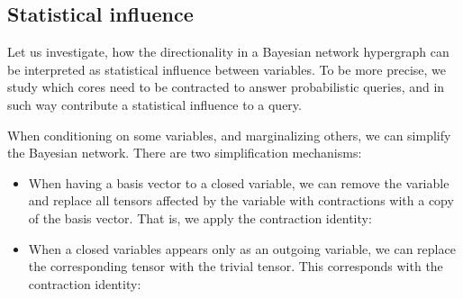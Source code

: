\subsection{Statistical influence}

Let us investigate, how the directionality in a Bayesian network hypergraph can be interpreted as statistical influence between variables.
To be more precise, we study which cores need to be contracted to answer probabilistic queries, and in such way contribute a statistical influence to a query.

When conditioning on some variables, and marginalizing others, we can simplify the Bayesian network.
There are two simplification mechanisms:
\begin{itemize}
    \item[(i)] When having a basis vector to a closed variable, we can remove the variable and replace all tensors affected by the variable with contractions with a copy of the basis vector.
    That is, we apply the contraction identity:
    \item[(ii)] When a closed variables appears only as an outgoing variable, we can replace the corresponding tensor with the trivial tensor.
    This corresponds with the contraction identity:
\end{itemize}


